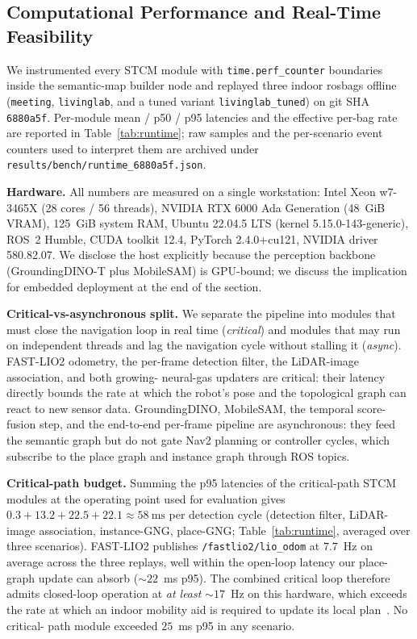 \subsection{Computational Performance and Real-Time Feasibility}
\label{sec:runtime}

We instrumented every STCM module with \texttt{time.perf\_counter}
boundaries inside the semantic-map builder node and replayed three
indoor rosbags offline (\texttt{meeting}, \texttt{livinglab}, and a
tuned variant \texttt{livinglab\_tuned}) on git SHA
\texttt{6880a5f}. Per-module mean / p50 / p95 latencies and the
effective per-bag rate are reported in Table~\ref{tab:runtime}; raw
samples and the per-scenario event counters used to interpret them
are archived under
\texttt{results/bench/runtime\_6880a5f.json}.

\noindent\textbf{Hardware.}
All numbers are measured on a single workstation: Intel Xeon
w7-3465X (28 cores / 56 threads), NVIDIA RTX 6000 Ada Generation
(48~GiB VRAM), 125~GiB system RAM, Ubuntu 22.04.5 LTS
(kernel 5.15.0-143-generic), ROS~2 Humble, CUDA toolkit 12.4,
PyTorch 2.4.0+cu121, NVIDIA driver 580.82.07. We disclose the host
explicitly because the perception backbone (GroundingDINO-T plus
MobileSAM) is GPU-bound; we discuss the implication for embedded
deployment at the end of the section.

\noindent\textbf{Critical-vs-asynchronous split.}
We separate the pipeline into modules that must close the
navigation loop in real time (\emph{critical}) and modules that may
run on independent threads and lag the navigation cycle without
stalling it (\emph{async}). FAST-LIO2 odometry, the per-frame
detection filter, the LiDAR-image association, and both growing-
neural-gas updaters are critical: their latency directly bounds the
rate at which the robot's pose and the topological graph can react
to new sensor data. GroundingDINO, MobileSAM, the temporal
score-fusion step, and the end-to-end per-frame pipeline are
asynchronous: they feed the semantic graph but do not gate Nav2
planning or controller cycles, which subscribe to the place graph
and instance graph through ROS topics.

\noindent\textbf{Critical-path budget.}
Summing the p95 latencies of the critical-path STCM modules at the
operating point used for evaluation gives
$0.3 + 13.2 + 22.5 + 22.1 \approx 58~\mathrm{ms}$ per detection cycle
(detection filter, LiDAR-image association, instance-GNG, place-GNG;
Table~\ref{tab:runtime}, averaged over three scenarios). FAST-LIO2
publishes \texttt{/fastlio2/lio\_odom} at $7.7$~Hz on average across
the three replays, well within the open-loop latency our place-graph
update can absorb ($\sim 22$~ms p95). The combined critical loop
therefore admits closed-loop operation at \emph{at least} $\sim 17$~Hz
on this hardware, which exceeds the rate at which an indoor mobility
aid is required to update its local plan~\cite{nav2}. No critical-
path module exceeded $25$~ms p95 in any scenario.

